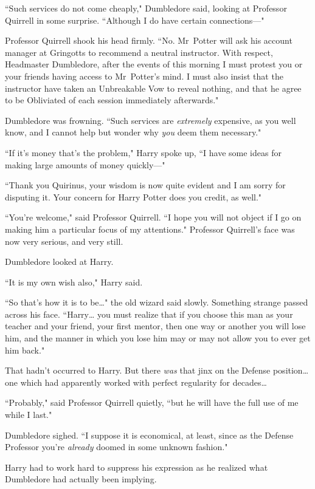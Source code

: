 ``Such services do not come cheaply," Dumbledore said, looking at Professor Quirrell in some surprise. ``Although I do have certain connections—"

Professor Quirrell shook his head firmly. ``No. Mr~Potter will ask his account manager at Gringotts to recommend a neutral instructor. With respect, Headmaster Dumbledore, after the events of this morning I must protest you or your friends having access to Mr~Potter's mind. I must also insist that the instructor have taken an Unbreakable Vow to reveal nothing, and that he agree to be Obliviated of each session immediately afterwards."

Dumbledore was frowning. ``Such services are \emph{extremely} expensive, as you well know, and I cannot help but wonder why \emph{you} deem them necessary."

``If it's money that's the problem," Harry spoke up, ``I have some ideas for making large amounts of money quickly—"

``Thank you Quirinus, your wisdom is now quite evident and I am sorry for disputing it. Your concern for Harry Potter does you credit, as well."

``You're welcome," said Professor Quirrell. ``I hope you will not object if I go on making him a particular focus of my attentions." Professor Quirrell's face was now very serious, and very still.

Dumbledore looked at Harry.

``It is my own wish also," Harry said.

``So that's how it is to be{\ldots}" the old wizard said slowly. Something strange passed across his face. ``Harry{\ldots} you must realize that if you choose this man as your teacher and your friend, your first mentor, then one way or another you will lose him, and the manner in which you lose him may or may not allow you to ever get him back."

That hadn't occurred to Harry. But there \emph{was} that jinx on the Defense position{\ldots} one which had apparently worked with perfect regularity for decades{\ldots}

``Probably," said Professor Quirrell quietly, ``but he will have the full use of me while I last."

Dumbledore sighed. ``I suppose it is economical, at least, since as the Defense Professor you're \emph{already} doomed in some unknown fashion."

Harry had to work hard to suppress his expression as he realized what Dumbledore had actually been implying.

